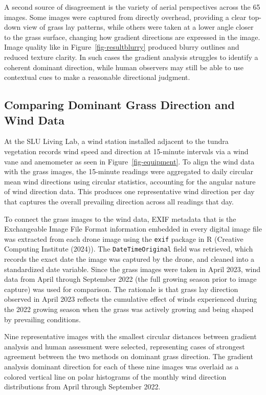 \documentclass[
]{article}
\begin{document}
A second source of disagreement is the variety of aerial perspectives
across the 65 images. Some images were captured from directly overhead,
providing a clear top-down view of grass lay patterns, while others were
taken at a lower angle closer to the grass surface, changing how
gradient directions are expressed in the image. Image quality like in
Figure~\ref{fig-resultblurry} produced blurry outlines and reduced
texture clarity. In such cases the gradient analysis struggles to
identify a coherent dominant direction, while human observers may still
be able to use contextual cues to make a reasonable directional
judgment.

\subsection{Comparing Dominant Grass Direction and Wind
Data}\label{comparing-dominant-grass-direction-and-wind-data}

At the SLU Living Lab, a wind station installed adjacent to the tundra
vegetation records wind speed and direction at 15-minute intervals via a
wind vane and anemometer as seen in Figure~\ref{fig-equipment}. To align
the wind data with the grass images, the 15-minute readings were
aggregated to daily circular mean wind directions using circular
statistics, accounting for the angular nature of wind direction data.
This produces one representative wind direction per day that captures
the overall prevailing direction across all readings that day.

To connect the grass images to the wind data, EXIF metadata that is the
Exchangeable Image File Format information embedded in every digital
image file was extracted from each drone image using the \texttt{exif}
package in R (Creative Computing Institute (2024)). The
\texttt{DateTimeOriginal} field was retrieved, which records the exact
date the image was captured by the drone, and cleaned into a
standardized date variable. Since the grass images were taken in April
2023, wind data from April through September 2022 (the full growing
season prior to image capture) was used for comparison. The rationale is
that grass lay direction observed in April 2023 reflects the cumulative
effect of winds experienced during the 2022 growing season when the
grass was actively growing and being shaped by prevailing conditions.

Nine representative images with the smallest circular distances between
gradient analysis and human assessment were selected, representing cases
of strongest agreement between the two methods on dominant grass
direction. The gradient analysis dominant direction for each of these
nine images was overlaid as a colored vertical line on polar histograms
of the monthly wind direction distributions from April through September
2022.
\end{document}
